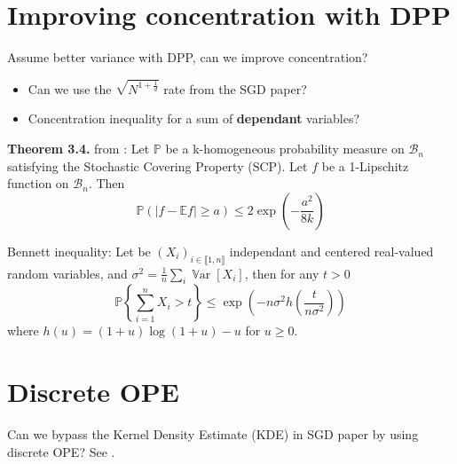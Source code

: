 \documentclass{article} %
\newcommand{\Var}{\operatorname{\mathbb V ar}}
\newcommand{\1}{\mathds{1}} %
\newcommand{\intint}[2]{\llbracket #1,#2 \rrbracket} %
\theoremstyle{definition} %
\begin{document}
\section{Improving concentration with DPP}

\begin{tcolorbox}
	Assume better variance with DPP, can we improve concentration?
\begin{itemize}
	\item Can we use the $\sqrt {N^{1 + \frac 1 d}}$ rate from the SGD paper?
	\item Concentration inequality for a sum of \textbf{dependant} variables?
\end{itemize}
\end{tcolorbox}

\textbf{Theorem 3.4.} from \cite{pemantle2011rayleighconcentration}: Let $\mathbb{P}$ be a k-homogeneous probability measure on $\mathcal{B}_{n}$ satisfying the Stochastic Covering Property (SCP). Let $f$ be a 1-Lipschitz function on $\mathcal{B}_{n}$. Then
$$
\mathbb{P}(\lvert f-\mathbb{E} f \rvert \geq a) \leq 2 \exp \left(-\frac{a^{2}}{8 k}\right)
$$

Bennett inequality: Let be $(X_i)_{i\in \intint{1}{n}}$ independant and centered real-valued random variables, and $\sigma^2 = \frac{1}{n}\sum_i \Var[X_i]$, then for any $t>0$
$$
\mathbb{P}\left\{\sum_{i=1}^{n} X_{i}>t\right\} \leq \exp \left(-n \sigma^{2} h\left(\frac{t}{n \sigma^{2}}\right)\right)
$$
where $h(u)=(1+u) \log (1+u)-u$ for $u \geq 0$.


\section{Discrete OPE}
\begin{tcolorbox}
	Can we bypass the Kernel Density Estimate (KDE) in SGD paper by using discrete OPE? See \cite{gautschi2004ope}.
	
\end{tcolorbox}
\end{document}
